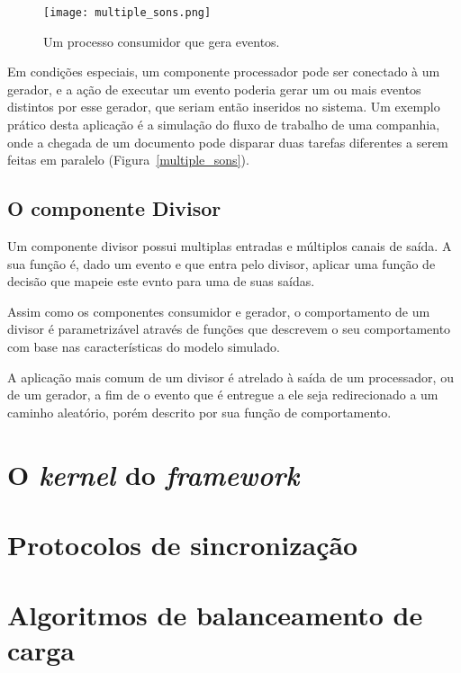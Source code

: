 \begin{figure}
  \centerline{\texttt{[image: multiple\_sons.png]}}
  \caption{Um processo consumidor que gera eventos.}
\label{fig:multiple_sons}
\end{figure}

Em condições especiais, um componente processador pode ser conectado à um gerador, e a ação de executar um evento poderia gerar um ou mais eventos distintos por esse gerador, que seriam então inseridos no sistema. Um exemplo prático desta aplicação é a simulação do fluxo de trabalho de uma companhia, onde a chegada de um documento pode disparar duas tarefas diferentes a serem feitas em paralelo (Figura~\ref{multiple_sons}).


\subsection{O componente Divisor \label{divisor}}

Um componente divisor possui multiplas entradas e múltiplos canais de saída. A sua função é, dado um evento e que entra pelo divisor, aplicar uma função de decisão que mapeie este evnto para uma de suas saídas.

Assim como os componentes consumidor e gerador, o comportamento de um divisor é parametrizável através de funções que descrevem o seu comportamento com base nas características do modelo simulado.

A aplicação mais comum de um divisor é atrelado à saída de um processador, ou de um gerador, a fim de o evento que é entregue a ele seja redirecionado a um caminho aleatório, porém descrito por sua função de comportamento.

\section{O \textit{kernel} do \textit{framework}}


\section{Protocolos de sincronização}


\section{Algoritmos de balanceamento de carga}
